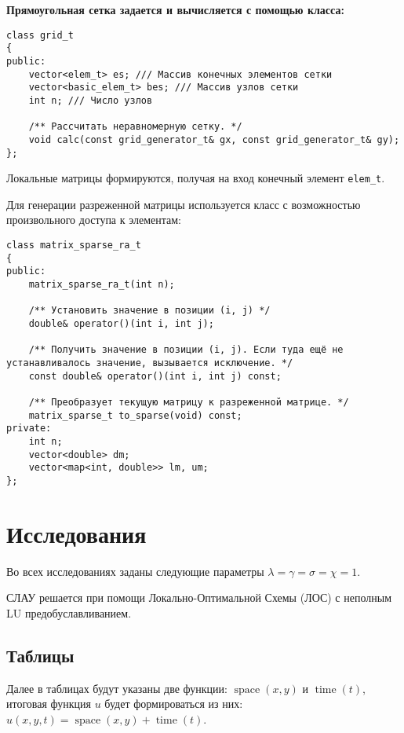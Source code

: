 \noindent\textbf{Прямоугольная сетка задается и вычисляется с помощью класса:}

\begin{verbatim}
class grid_t
{
public:
	vector<elem_t> es; /// Массив конечных элементов сетки
	vector<basic_elem_t> bes; /// Массив узлов сетки
	int n; /// Число узлов

	/** Рассчитать неравномерную сетку. */
	void calc(const grid_generator_t& gx, const grid_generator_t& gy);
};
\end{verbatim}

Локальные матрицы формируются, получая на вход конечный элемент \texttt{elem\_t}.

Для генерации разреженной матрицы используется класс с возможностью произвольного доступа к элементам:

\begin{verbatim}
class matrix_sparse_ra_t
{
public:
	matrix_sparse_ra_t(int n);

	/** Установить значение в позиции (i, j) */
	double& operator()(int i, int j);

	/** Получить значение в позиции (i, j). Если туда ещё не устанавливалось значение, вызывается исключение. */
	const double& operator()(int i, int j) const;

	/** Преобразует текущую матрицу к разреженной матрице. */
	matrix_sparse_t to_sparse(void) const;
private:
	int n;
	vector<double> dm;
	vector<map<int, double>> lm, um;
};
\end{verbatim}

\section{Исследования}

Во всех исследованиях заданы следующие параметры $ \lambda = \gamma = \sigma = \chi = 1$.

СЛАУ решается при помощи Локально-Оптимальной Схемы (ЛОС) с неполным LU предобуславливанием.

\subsection{Таблицы}

Далее в таблицах будут указаны две функции: $\operatorname{space}(x, y)$ и $\operatorname{time}(t)$, итоговая функция $u$ будет формироваться из них: $u(x, y, t) = \operatorname{space}(x, y) + \operatorname{time}(t) $.

